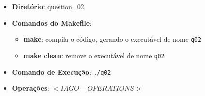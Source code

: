\begin{itemize}
	\item{\textbf{Diretório}: question\_02}
	\item{\textbf{Comandos do Makefile}:
	\begin{itemize}
		\item{\textbf{make}: compila o código, gerando o executável de nome \texttt{q02}}
		\item{\textbf{make clean}: remove o executável de nome \texttt{q02}}
	\end{itemize}}
	\item{\textbf{Comando de Execução}: \texttt{./q02}}
	\item{\textbf{Operações}: $<IAGO-OPERATIONS>$}
\end{itemize}

